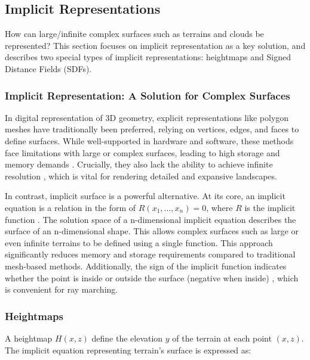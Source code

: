 \subsection{Implicit Representations}

How can large/infinite complex surfaces such as terrains and clouds be represented? This section focuses on implicit representation as a key solution, and describes two special types of  implicit representations: heightmaps and Signed Distance Fields (SDFs).


\subsubsection{Implicit Representation: A Solution for Complex Surfaces}

In digital representation of 3D geometry, explicit representations like polygon meshes have traditionally been preferred, relying on vertices, edges, and faces to define surfaces. While well-supported in hardware and software, these methods face limitations with large or complex surfaces, leading to high storage and memory demands \cite{team_main_2019}. Crucially, they also lack the ability to achieve infinite resolution \cite{team_main_2019}, which is vital for rendering detailed and expansive landscapes.

In contrast, implicit surface is a powerful alternative. At its core, an implicit equation is a relation in the form of $R(x_1,\dots,x_n)=0$, where $R$ is the implicit function \cite{osher_implicit_2006}. The solution space of a n-dimensional implicit equation describes the surface of an n-dimensional shape. This allows complex surfaces such as large or even infinite terrains to be defined using a single function. This approach significantly reduces memory and storage requirements compared to traditional mesh-based methods. Additionally, the sign of the implicit function indicates whether the point is inside or outside the surface (negative when inside) \cite{osher_implicit_2006}, which is convenient for ray marching.

\subsubsection{Heightmaps}
\label{Heightmap}

A heightmap $H(x,z)$ define the elevation $y$ of the terrain at each point $(x,z)$. The implicit equation representing terrain's surface is expressed as:

